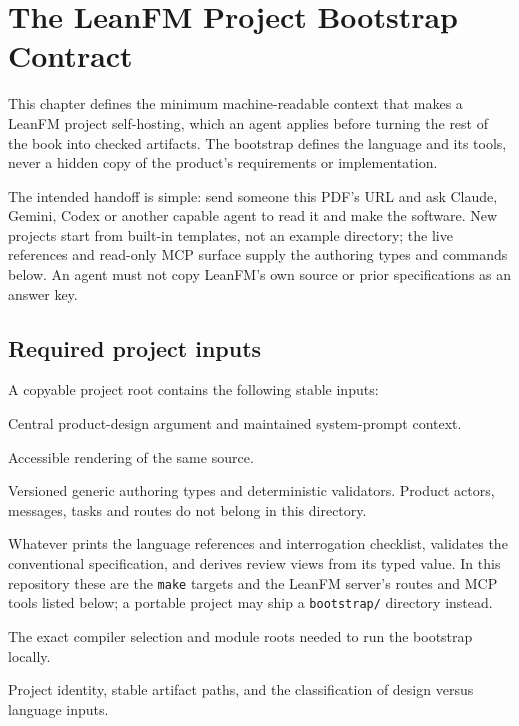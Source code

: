 \chapter{The LeanFM Project Bootstrap Contract}
\label{ch:bootstrap-contract}

This chapter defines the minimum machine-readable context that makes a LeanFM
project self-hosting, which an agent applies before turning the rest of the book
into checked artifacts. The bootstrap defines the language and its tools, never a
hidden copy of the product's requirements or implementation.

The intended handoff is simple: send someone this PDF's URL and ask Claude,
Gemini, Codex or another capable agent to read it and make the software. New
projects start from built-in templates, not an example directory; the live
references and read-only MCP surface supply the authoring types and commands
below. An agent must not copy LeanFM's own source or prior specifications as an
answer key.

\section{Required project inputs}

A copyable project root contains the following stable inputs:

\begin{description}[style=nextline]
  \item[\texttt{book/main.pdf}] Central product-design argument and maintained
        system-prompt context.
  \item[\texttt{book/main-dark.pdf}] Accessible rendering of the same source.
  \item[\texttt{LeanFM/}] Versioned generic authoring types and deterministic
        validators. Product actors, messages, tasks and routes do not belong in
        this directory.
  \item[Bootstrap programs] Whatever prints the language references and
        interrogation checklist, validates the conventional specification, and
        derives review views from its typed value. In this repository these are
        the \texttt{make} targets and the LeanFM server's routes and MCP tools
        listed below; a portable project may ship a \texttt{bootstrap/}
        directory instead.
  \item[\texttt{lean-toolchain} and \texttt{lakefile.toml}] The exact compiler
        selection and module roots needed to run the bootstrap locally.
  \item[\texttt{project.json}] Project identity, stable artifact paths,
        and the classification of design versus language
        inputs.
\end{description}

